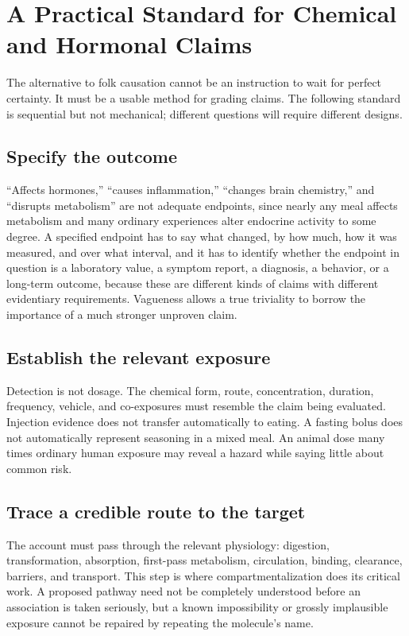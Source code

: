 \documentclass[11pt]{article}
\begin{document}
\section{A Practical Standard for Chemical and Hormonal Claims}

The alternative to folk causation cannot be an instruction to wait for perfect certainty. It must be a usable method for grading claims. The following standard is sequential but not mechanical; different questions will require different designs.

\subsection{Specify the outcome}

``Affects hormones,'' ``causes inflammation,'' ``changes brain chemistry,'' and ``disrupts metabolism'' are not adequate endpoints, since nearly any meal affects metabolism and many ordinary experiences alter endocrine activity to some degree. A specified endpoint has to say what changed, by how much, how it was measured, and over what interval, and it has to identify whether the endpoint in question is a laboratory value, a symptom report, a diagnosis, a behavior, or a long-term outcome, because these are different kinds of claims with different evidentiary requirements. Vagueness allows a true triviality to borrow the importance of a much stronger unproven claim.

\subsection{Establish the relevant exposure}

Detection is not dosage. The chemical form, route, concentration, duration, frequency, vehicle, and co-exposures must resemble the claim being evaluated. Injection evidence does not transfer automatically to eating. A fasting bolus does not automatically represent seasoning in a mixed meal. An animal dose many times ordinary human exposure may reveal a hazard while saying little about common risk.

\subsection{Trace a credible route to the target}

The account must pass through the relevant physiology: digestion, transformation, absorption, first-pass metabolism, circulation, binding, clearance, barriers, and transport. This step is where compartmentalization does its critical work. A proposed pathway need not be completely understood before an association is taken seriously, but a known impossibility or grossly implausible exposure cannot be repaired by repeating the molecule's name.
\end{document}
